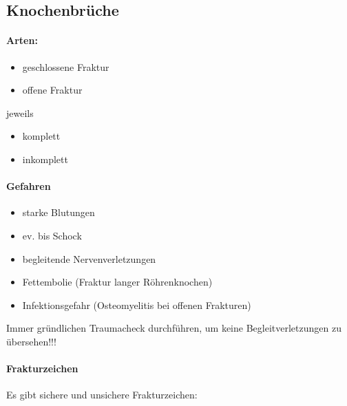 \subsection{Knochenbr\"uche}

\paragraph{Arten:}

\begin{itemize}
    \item geschlossene Fraktur
    \item offene Fraktur
\end{itemize}

jeweils

\begin{itemize}
    \item komplett
    \item inkomplett
\end{itemize}

\paragraph{Gefahren}

\begin{itemize}
    \item starke Blutungen
    \item ev. bis Schock
    \item begleitende Nervenverletzungen
    \item Fettembolie (Fraktur langer R\"ohrenknochen)
    \item Infektionsgefahr (Osteomyelitis bei offenen  Frakturen)
\end{itemize}

Immer gr\"undlichen Traumacheck  durchf\"uhren, um keine 
Begleitverletzungen zu \"ubersehen!!!


\paragraph{Frakturzeichen} 

Es gibt sichere und unsichere Frakturzeichen:

